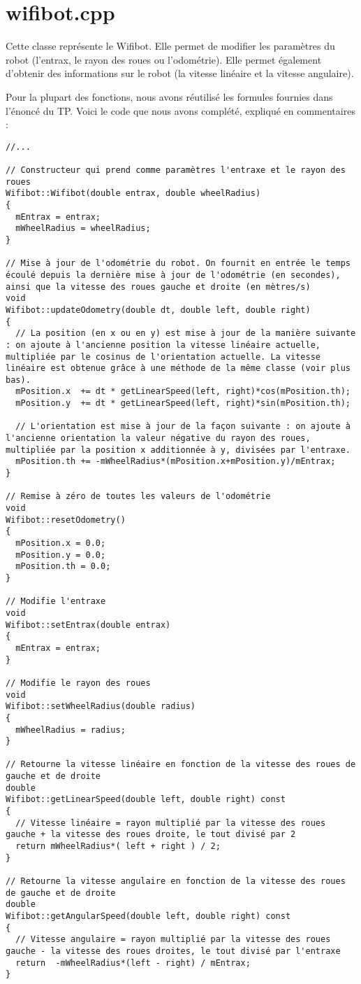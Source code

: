 \documentclass[11pt,a4paper,oneside,french,svgnames]{report}
\begin{document}
\section{wifibot.cpp}
Cette classe représente le Wifibot. Elle permet de modifier les paramètres du robot (l’entrax, le rayon des roues ou l’odométrie). Elle permet également d’obtenir des informations sur le robot (la vitesse linéaire et la vitesse angulaire). 

\medskip

Pour la plupart des fonctions, nous avons réutilisé les formules fournies dans l'énoncé du TP. Voici le code que nous avons complété, expliqué en commentaires :
\begin{lstlisting}
//...

// Constructeur qui prend comme paramètres l'entraxe et le rayon des roues
Wifibot::Wifibot(double entrax, double wheelRadius)
{
  mEntrax = entrax;
  mWheelRadius = wheelRadius;
}

// Mise à jour de l'odométrie du robot. On fournit en entrée le temps écoulé depuis la dernière mise à jour de l'odométrie (en secondes), ainsi que la vitesse des roues gauche et droite (en mètres/s)
void
Wifibot::updateOdometry(double dt, double left, double right)
{
  // La position (en x ou en y) est mise à jour de la manière suivante : on ajoute à l'ancienne position la vitesse linéaire actuelle, multipliée par le cosinus de l'orientation actuelle. La vitesse linéaire est obtenue grâce à une méthode de la même classe (voir plus bas).
  mPosition.x  += dt * getLinearSpeed(left, right)*cos(mPosition.th);
  mPosition.y  += dt * getLinearSpeed(left, right)*sin(mPosition.th);

  // L'orientation est mise à jour de la façon suivante : on ajoute à l'ancienne orientation la valeur négative du rayon des roues, multipliée par la position x additionnée à y, divisées par l'entraxe.
  mPosition.th += -mWheelRadius*(mPosition.x+mPosition.y)/mEntrax;
}

// Remise à zéro de toutes les valeurs de l'odométrie
void
Wifibot::resetOdometry()
{
  mPosition.x = 0.0;
  mPosition.y = 0.0;
  mPosition.th = 0.0;
}

// Modifie l'entraxe
void
Wifibot::setEntrax(double entrax)
{
  mEntrax = entrax;
}

// Modifie le rayon des roues
void
Wifibot::setWheelRadius(double radius)
{
  mWheelRadius = radius;
}

// Retourne la vitesse linéaire en fonction de la vitesse des roues de gauche et de droite
double
Wifibot::getLinearSpeed(double left, double right) const
{
  // Vitesse linéaire = rayon multiplié par la vitesse des roues gauche + la vitesse des roues droite, le tout divisé par 2
  return mWheelRadius*( left + right ) / 2;
}

// Retourne la vitesse angulaire en fonction de la vitesse des roues de gauche et de droite
double
Wifibot::getAngularSpeed(double left, double right) const
{
  // Vitesse angulaire = rayon multiplié par la vitesse des roues gauche - la vitesse des roues droites, le tout divisé par l'entraxe
  return  -mWheelRadius*(left - right) / mEntrax;
}
\end{lstlisting}
\end{document}
